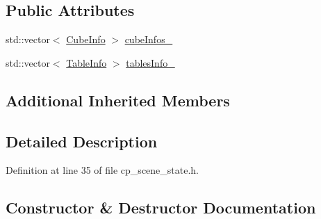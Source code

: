 \subsection*{Public Attributes}
\begin{DoxyCompactItemize}
\item 
std\+::vector$<$ \hyperlink{structsm__fetch__two__table__whiskey__pour_1_1cl__perception__system_1_1CubeInfo}{Cube\+Info} $>$ \hyperlink{classsm__fetch__two__table__whiskey__pour_1_1cl__perception__system_1_1CpSceneState_a8106a20f8f9a385835a39f6fb2960165}{cube\+Infos\+\_\+}
\item 
std\+::vector$<$ \hyperlink{structsm__fetch__two__table__whiskey__pour_1_1cl__perception__system_1_1TableInfo}{Table\+Info} $>$ \hyperlink{classsm__fetch__two__table__whiskey__pour_1_1cl__perception__system_1_1CpSceneState_a5d6fd3eb480fbb9a241c44ddd42c2930}{tables\+Info\+\_\+}
\end{DoxyCompactItemize}
\subsection*{Additional Inherited Members}


\subsection{Detailed Description}


Definition at line 35 of file cp\+\_\+scene\+\_\+state.\+h.



\subsection{Constructor \& Destructor Documentation}
\mbox{\label{classsm__fetch__two__table__whiskey__pour_1_1cl__perception__system_1_1CpSceneState_acb5205f7209aa6cdf8355e20b42e0fc0}} 
